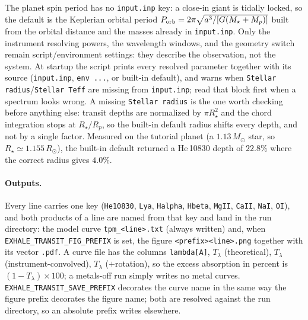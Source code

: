 \documentclass[english,a4paper]{my_memo}
\begin{document}
\noindent The planet spin period has no \texttt{input.inp} key: a close-in
giant is tidally locked, so the default is the Keplerian orbital period
$P_{\rm orb}=2\pi\sqrt{a^3/[G(M_\star+M_p)]}$ built from the orbital distance
and the masses already in \texttt{input.inp}. Only the instrument resolving
powers, the wavelength windows, and the geometry switch remain
script/environment settings: they describe the observation, not the
system. At startup the script prints every resolved parameter together with
its source (\texttt{input.inp}, \texttt{env ...}, or built-in default), and
warns when \texttt{Stellar radius}/\texttt{Stellar Teff} are missing from
\texttt{input.inp}; read that block first when a spectrum looks wrong. A
missing \texttt{Stellar radius} is the one worth checking before anything
else: transit depths are normalized by $\pi R_\star^2$ and the chord
integration stops at $R_\star/R_p$, so the built-in default radius shifts every
depth, and not by a single factor. Measured on the tutorial planet (a
$1.13\,M_\odot$ star, so $R_\star \simeq 1.155\,R_\odot$), the built-in default
returned a He\,10830 depth of $22.8\%$ where the correct radius gives
$4.0\%$.

\paragraph{Outputs.} Every line carries one key (\texttt{He10830},
\texttt{Lya}, \texttt{Halpha}, \texttt{Hbeta}, \texttt{MgII}, \texttt{CaII},
\texttt{NaI}, \texttt{OI}), and both products of a line are named from that key and land
in the run directory: the model curve \texttt{tpm\_<line>.txt} (always written)
and, when \texttt{EXHALE\_TRANSIT\_FIG\_PREFIX} is set, the figure
\texttt{<prefix><line>.png} together with its vector \texttt{.pdf}. A curve
file has the columns \texttt{lambda[A]}, $T_\lambda$ (theoretical),
$T_\lambda$ (instrument-convolved), $T_\lambda$ ($+$rotation), so the excess
absorption in percent is $(1-T_\lambda)\times100$; a metals-off run simply
writes no metal curves. \texttt{EXHALE\_TRANSIT\_SAVE\_PREFIX} decorates the
curve name in the same way the figure prefix decorates the figure name; both
are resolved against the run directory, so an absolute prefix writes elsewhere.
\end{document}
